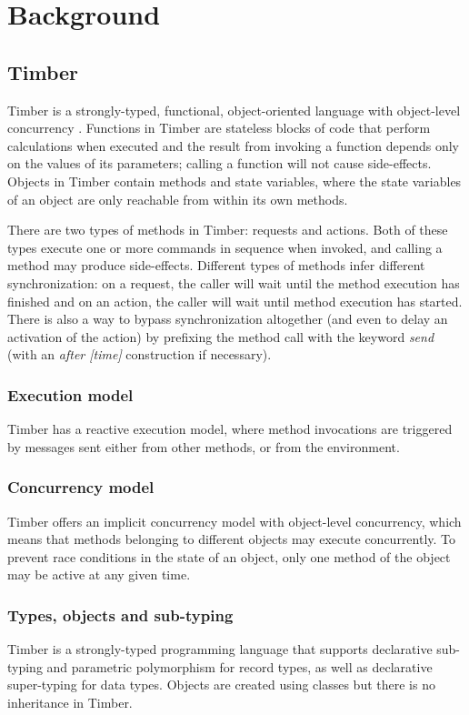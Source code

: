 \documentclass[a4paper]{article}
\begin{document}
\section{Background}
\subsection{Timber}
Timber is a strongly-typed, functional, object-oriented language with object-level concurrency \cite{timberLang}. Functions in Timber are stateless blocks of code that perform calculations when executed and the result from invoking a function depends only on the values of its parameters; calling a function will not cause side-effects. Objects in Timber contain methods and state variables, where the state variables of an object are only reachable from within its own methods.

There are two types of methods in Timber: requests and actions. Both of these types execute one or more commands in sequence when invoked, and calling a method may produce side-effects. Different types of methods infer different synchronization: on a request, the caller will wait until the method execution has finished and on an action, the caller will wait until method execution has started. There is also a way to bypass synchronization altogether (and even to delay an activation of the action) by prefixing the method call with the keyword \textit{send} (with an \textit{after [time]} construction if necessary).

\subsubsection*{Execution model}
Timber has a reactive execution model, where method invocations are triggered by messages sent either from other methods, or from the environment.

\subsubsection*{Concurrency model}
Timber offers an implicit concurrency model with object-level concurrency, which means that methods belonging to different objects may execute concurrently. To prevent race conditions in the state of an object, only one method of the object may be active at any given time. 

\subsubsection*{Types, objects and sub-typing}
Timber is a strongly-typed programming language that supports declarative sub-typing and parametric polymorphism for record types, as well as declarative super-typing for data types. Objects are created using classes but there is no inheritance in Timber. 
\end{document}
